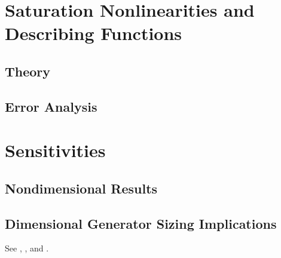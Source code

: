 \documentclass{ifacconf}
\begin{document}
\section{Saturation Nonlinearities and Describing Functions}

\subsection{Theory}

\subsection{Error Analysis}

\section{Sensitivities}
\subsection{Nondimensional Results}
\subsection{Dimensional Generator Sizing Implications}


See \cite{Abl:56}, \cite{AbTaRu:54}, \cite{Keo:58} and \cite{Pow:85}.

\end{document}
